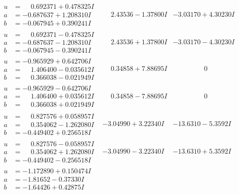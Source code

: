 \documentclass[1p]{elsarticle_modified}
\theoremstyle{definition}
\begin{document}
$$\begin{array}{c|c|c}
\begin{aligned}
u &= \phantom{-}0.692371 + 0.478325 I \\
a &= -0.687637 + 1.208310 I \\
b &= -0.067945 + 0.390241 I\end{aligned}
 & \phantom{-}2.43536 - 1.37800 I & -3.03170 + 4.30230 I \\ \hline\begin{aligned}
u &= \phantom{-}0.692371 - 0.478325 I \\
a &= -0.687637 - 1.208310 I \\
b &= -0.067945 - 0.390241 I\end{aligned}
 & \phantom{-}2.43536 + 1.37800 I & -3.03170 - 4.30230 I \\ \hline\begin{aligned}
u &= -0.965929 + 0.642706 I \\
a &= \phantom{-}1.406400 - 0.035612 I \\
b &= \phantom{-}0.366038 - 0.021949 I\end{aligned}
 & \phantom{-}0.34858 + 7.88695 I & \phantom{-0.000000 } 0 \\ \hline\begin{aligned}
u &= -0.965929 - 0.642706 I \\
a &= \phantom{-}1.406400 + 0.035612 I \\
b &= \phantom{-}0.366038 + 0.021949 I\end{aligned}
 & \phantom{-}0.34858 - 7.88695 I & \phantom{-0.000000 } 0 \\ \hline\begin{aligned}
u &= \phantom{-}0.827576 + 0.058957 I \\
a &= \phantom{-}0.354062 - 1.262080 I \\
b &= -0.449402 + 0.256518 I\end{aligned}
 & -3.04990 + 3.22340 I & -13.6310 - 5.3592 I \\ \hline\begin{aligned}
u &= \phantom{-}0.827576 - 0.058957 I \\
a &= \phantom{-}0.354062 + 1.262080 I \\
b &= -0.449402 - 0.256518 I\end{aligned}
 & -3.04990 - 3.22340 I & -13.6310 + 5.3592 I \\ \hline\begin{aligned}
u &= -1.172890 + 0.150474 I \\
a &= -1.81652 - 0.37330 I \\
b &= -1.64426 + 0.42875 I\end{aligned}

\end{array}$$
\end{document}
